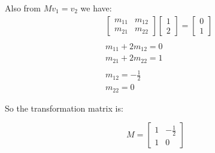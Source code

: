 \documentclass{ximera}
\begin{document}
\begin{question}
Also from  $M v_1 = v_2$ we have:
\begin{align*}
&\begin{bmatrix}
m_{11} & m_{12} \\
m_{21} & m_{22}
\end{bmatrix}
\begin{bmatrix}
1 \\
2
\end{bmatrix}
= 
\begin{bmatrix}
0 \\
1
\end{bmatrix} \\
\\
& m_{11} + 2 m_{12} = 0 \\
& m_{21} + 2 m_{22} = 1 \\
\\
&m_{12} = - \frac{1}{2} \\
&m_{22} = 0
\end{align*}

So the transformation matrix is:
\begin{center}
\begin{equation*}
M =
\begin{bmatrix}
1 & -\frac{1}{2} \\
1 & 0
\end{bmatrix}
\end{equation*}
\end{center}


\end{question}
\end{document}
